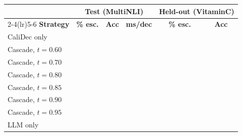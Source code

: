 \begin{tabular}{lccccc}
\toprule
& \multicolumn{3}{c}{\textbf{Test (MultiNLI)}} & \multicolumn{2}{c}{\textbf{Held-out (VitaminC)}} \\
\cmidrule(lr){2-4}\cmidrule(lr){5-6}
\textbf{Strategy} & \textbf{\% esc.} & \textbf{Acc} & \textbf{ms/dec} & \textbf{\% esc.} & \textbf{Acc} \\
\midrule
CaliDec only & \ph{--} & \ph{--} & \ph{--} & \ph{--} & \ph{--} \\
Cascade, $t=0.60$ & \ph{--} & \ph{--} & \ph{--} & \ph{--} & \ph{--} \\
Cascade, $t=0.70$ & \ph{--} & \ph{--} & \ph{--} & \ph{--} & \ph{--} \\
Cascade, $t=0.80$ & \ph{--} & \ph{--} & \ph{--} & \ph{--} & \ph{--} \\
Cascade, $t=0.85$ & \ph{--} & \ph{--} & \ph{--} & \ph{--} & \ph{--} \\
Cascade, $t=0.90$ & \ph{--} & \ph{--} & \ph{--} & \ph{--} & \ph{--} \\
Cascade, $t=0.95$ & \ph{--} & \ph{--} & \ph{--} & \ph{--} & \ph{--} \\
LLM only & \ph{--} & \ph{--} & \ph{--} & \ph{--} & \ph{--} \\
\bottomrule
\end{tabular}
